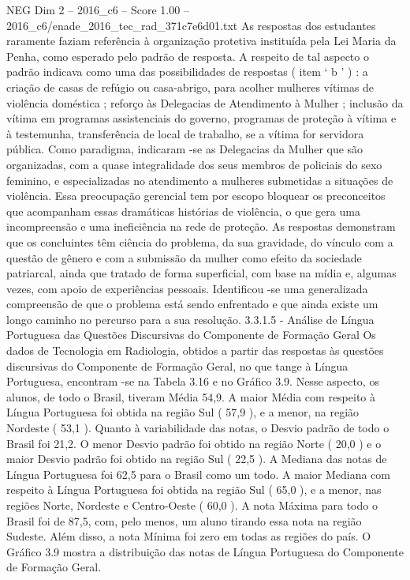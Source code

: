 \begin{textsample}{NEG Dim 2 – 2016\_c6 – Score 1.00 – 2016\_c6/enade\_2016\_tec\_rad\_371c7e6d01.txt}
As respostas dos estudantes raramente faziam referência à organização protetiva instituída pela Lei Maria da Penha, como esperado pelo padrão de resposta.
A respeito de tal aspecto o padrão indicava como uma das possibilidades de respostas ( item ‘ b ’ ) : a criação de casas de refúgio ou casa-abrigo, para acolher mulheres vítimas de violência doméstica ; reforço às Delegacias de Atendimento à Mulher ; inclusão da vítima em programas assistenciais do governo, programas de proteção à vítima e à testemunha, transferência de local de trabalho, se a vítima for servidora pública.
Como paradigma, indicaram -se as Delegacias da Mulher que são organizadas, com a quase integralidade dos seus membros de policiais do sexo feminino, e especializadas no atendimento a mulheres submetidas a situações de violência.
Essa preocupação gerencial tem por escopo bloquear os preconceitos que acompanham essas dramáticas histórias de violência, o que gera uma incompreensão e uma ineficiência na rede de proteção.
As respostas demonstram que os concluintes têm ciência do problema, da sua gravidade, do vínculo com a questão de gênero e com a submissão da mulher como efeito da sociedade patriarcal, ainda que tratado de forma superficial, com base na mídia e, algumas vezes, com apoio de experiências pessoais.
Identificou -se uma generalizada compreensão de que o problema está sendo enfrentado e que ainda existe um longo caminho no percurso para a sua resolução. 3.3.1.5 - Análise de Língua Portuguesa das Questões Discursivas do Componente de Formação Geral Os dados de Tecnologia em Radiologia, obtidos a partir das respostas às questões discursivas do Componente de Formação Geral, no que tange à Língua Portuguesa, encontram -se na Tabela 3.16 e no Gráfico 3.9.
Nesse aspecto, os alunos, de todo o Brasil, tiveram Média 54,9.
A maior Média com respeito à Língua Portuguesa foi obtida na região Sul ( 57,9 ), e a menor, na região Nordeste ( 53,1 ).
Quanto à variabilidade das notas, o Desvio padrão de todo o Brasil foi 21,2.
O menor Desvio padrão foi obtido na região Norte ( 20,0 ) e o maior Desvio padrão foi obtido na região Sul ( 22,5 ).
A Mediana das notas de Língua Portuguesa foi 62,5 para o Brasil como um todo.
A maior Mediana com respeito à Língua Portuguesa foi obtida na região Sul ( 65,0 ), e a menor, nas regiões Norte, Nordeste e Centro-Oeste ( 60,0 ).
A nota Máxima para todo o Brasil foi de 87,5, com, pelo menos, um aluno tirando essa nota na região Sudeste.
Além disso, a nota Mínima foi zero em todas as regiões do país.
O Gráfico 3.9 mostra a distribuição das notas de Língua Portuguesa do Componente de Formação Geral.

\end{textsample}
